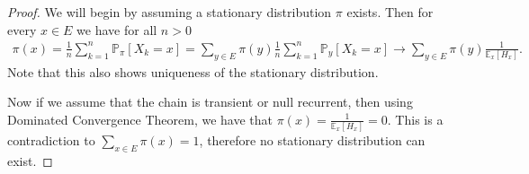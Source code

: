\begin{proof}
	We will begin by assuming a stationary distribution $\pi$ exists. Then for every $x \in E$ we have for all $n> 0$
	\begin{align}
		\pi (x) = \frac{1}{n} \sum_{k=1}^{n} \mathbb{P}_{\pi } \left[ X_k=x \right]  = \sum_{y \in E}^{} \pi(y) \frac{1}{n} \sum_{k=1}^{n} \mathbb{P}_{y} \left[ X_k = x \right] \to \sum_{y \in E}^{} \pi (y) \frac{1}{\mathbb{E}_{x} \left[ H_x \right] }	
	.\end{align}	
	{\color{blue}Note that this also shows uniqueness of the stationary distribution.}

	Now if we assume that the chain is transient or null recurrent, then using Dominated Convergence Theorem, we have that $\pi (x) = \frac{1}{\mathbb{E}_{x} \left[ H_x \right] } = 0$. This is a contradiction to $\sum_{x \in E}^{} \pi (x) = 1$, therefore no stationary distribution can exist.


\end{proof}
